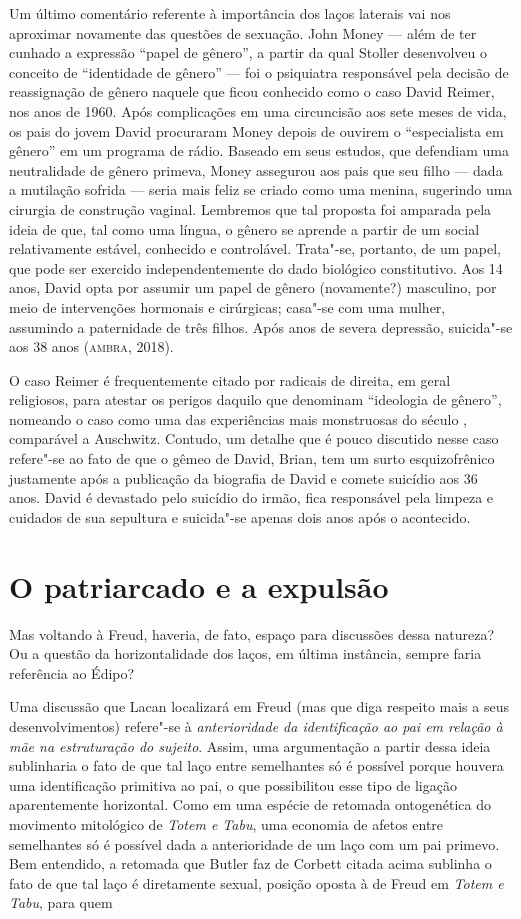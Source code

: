 Um último comentário referente à importância dos laços laterais vai nos
aproximar novamente das questões de sexuação. John Money --- além de ter
cunhado a expressão ``papel de gênero'', a partir da qual Stoller
desenvolveu o conceito de ``identidade de gênero'' --- foi o psiquiatra
responsável pela decisão de reassignação de gênero naquele que ficou
conhecido como o caso David Reimer, nos anos de 1960. Após complicações
em uma circuncisão aos sete meses de vida, os pais do jovem David
procuraram Money depois de ouvirem o ``especialista em gênero'' em um
programa de rádio. Baseado em seus estudos, que defendiam uma
neutralidade de gênero primeva, Money assegurou aos pais que seu filho
--- dada a mutilação sofrida --- seria mais feliz se criado como uma
menina, sugerindo uma cirurgia de construção vaginal. Lembremos que tal
proposta foi amparada pela ideia de que, tal como uma língua, o gênero
se aprende a partir de um social relativamente estável, conhecido e
controlável. Trata"-se, portanto, de um papel, que pode ser exercido
independentemente do dado biológico constitutivo. Aos 14 anos, David
opta por assumir um papel de gênero (novamente?) masculino, por meio de
intervenções hormonais e cirúrgicas; casa"-se com uma mulher, assumindo a
paternidade de três filhos. Após anos de severa depressão, suicida"-se
aos 38 anos (\textsc{ambra}, 2018).

O caso Reimer é frequentemente citado por radicais de direita, em geral
religiosos, para atestar os perigos daquilo que denominam ``ideologia de
gênero'', nomeando o caso como uma das experiências mais monstruosas do
século , comparável a Auschwitz. Contudo, um detalhe que é pouco
discutido nesse caso refere"-se ao fato de que o gêmeo de David, Brian,
tem um surto esquizofrênico justamente após a publicação da biografia de
David e comete suicídio aos 36 anos. David é devastado pelo suicídio do
irmão, fica responsável pela limpeza e cuidados de sua sepultura e
suicida"-se apenas dois anos após o acontecido.

\section{O patriarcado e a expulsão}

Mas voltando à Freud, haveria, de fato, espaço para discussões dessa
natureza? Ou a questão da horizontalidade dos laços, em última
instância, sempre faria referência ao Édipo?

Uma discussão que Lacan localizará em Freud (mas que diga respeito mais
a seus desenvolvimentos) refere"-se à \emph{anterioridade da
identificação ao pai em relação à mãe na estruturação do sujeito}.
Assim, uma argumentação a partir dessa ideia sublinharia o fato de que
tal laço entre semelhantes só é possível porque houvera uma
identificação primitiva ao pai, o que possibilitou esse tipo de ligação
aparentemente horizontal. Como em uma espécie de retomada ontogenética
do movimento mitológico de \emph{Totem e Tabu}, uma economia de afetos
entre semelhantes só é possível dada a anterioridade de um laço com um
pai primevo. Bem entendido, a retomada que Butler faz de Corbett citada
acima sublinha o fato de que tal laço é diretamente sexual, posição
oposta à de Freud em \emph{Totem e Tabu}, para quem

